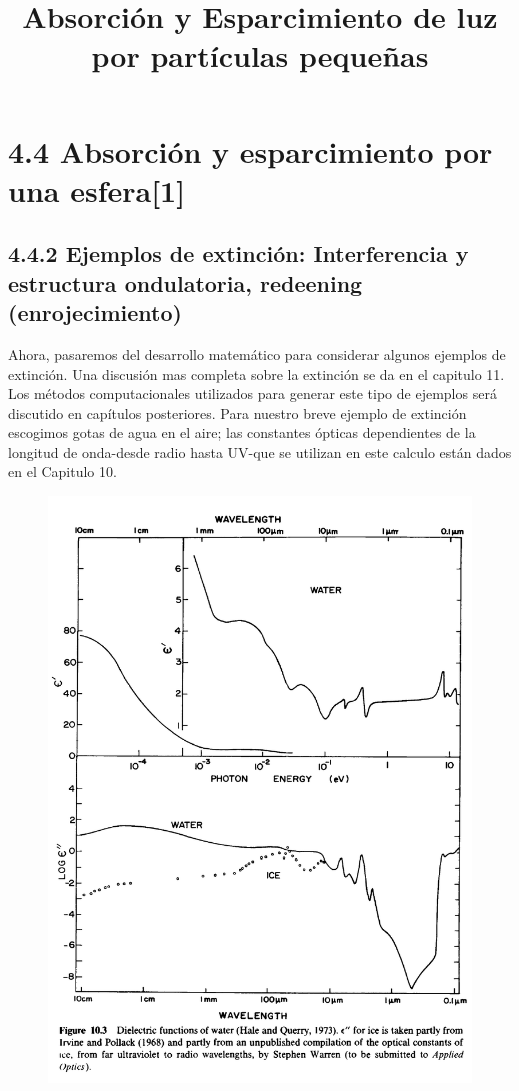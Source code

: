 \documentclass[11pt]{article}
\title{Absorción y Esparcimiento de luz por partículas pequeñas}
\author{\Name{} \texttt{\Login}}
\date{}
\begin{document}
\section*{4.4 Absorción y esparcimiento por una esfera[1]}
\subsection*{4.4.2 Ejemplos de extinción: Interferencia y estructura ondulatoria, redeening (enrojecimiento)}

Ahora, pasaremos del desarrollo matemático para considerar algunos ejemplos de extinción. Una discusión mas completa sobre la extinción se da en el capitulo 11. Los métodos computacionales utilizados para generar este tipo de ejemplos será discutido en capítulos posteriores. Para nuestro breve ejemplo de extinción escogimos gotas de agua en el aire; las constantes ópticas dependientes de la longitud de onda-desde radio hasta UV-que se utilizan en este calculo están dados en el Capitulo 10.

\begin{figure}[H]
\centering
\includegraphics[scale=0.4]{1.png}
\label{fig:p0}
\end{figure}
\end{document}

